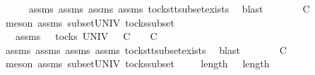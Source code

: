 \ \ \ \ \isamarkupfalse%
\ assms{\isacharparenleft}{}{\isacharparenright}\ assms{\isacharparenleft}{}{\isacharparenright}\ assms{\isacharparenleft}{}{\isacharparenright}\ assms{\isacharparenleft}{}{\isacharparenright}\ tocks{\isacharunderscore}tt{\isacharunderscore}subset{\isacharunderscore}exists\ \isamarkupfalse%
\ blast\isanewline
\ \ \isamarkupfalse%
\ \isamarkupfalse%
\ {}{\isacharcolon}\ {\isachardoublequoteopen}{\isasymrho}{\isacharprime}{\isacharprime}\ {\isasymle}\isactrlsub C\ {\isasymrho}{\isacharprime}{\isachardoublequoteclose}\isanewline
\ \ \ \ \isamarkupfalse%
\ {\isacharparenleft}meson\ assms{\isacharparenleft}{}{\isacharparenright}\ subset{\isacharunderscore}UNIV\ tocks{\isacharunderscore}subset{\isacharparenright}\isanewline
\ \ \isamarkupfalse%
\ {\isasymrho}{\isacharprime}{\isacharprime}{\isacharprime}\ \ {\isasymrho}{\isacharprime}{\isacharprime}{\isacharprime}{\isacharunderscore}assms{\isacharcolon}\ {\isachardoublequoteopen}{\isasymrho}{\isacharprime}{\isacharprime}{\isacharprime}\ {\isasymin}\ tocks\ UNIV\ {\isasymand}\ {\isasymrho}{\isacharprime}\ {\isasymsubseteq}\isactrlsub C\ {\isasymrho}{\isacharprime}{\isacharprime}{\isacharprime}\ {\isasymand}\ {\isasymrho}{\isacharprime}{\isacharprime}{\isacharprime}\ {\isasymle}\isactrlsub C\ {\isasymrho}\ {\isacharat}\ {\isasymsigma}{\isachardoublequoteclose}\isanewline
\ \ \ \ \isamarkupfalse%
\ assms{\isacharparenleft}{}{\isacharparenright}\ assms{\isacharparenleft}{}{\isacharparenright}\ assms{\isacharparenleft}{}{\isacharparenright}\ assms{\isacharparenleft}{}{\isacharparenright}\ tocks{\isacharunderscore}tt{\isacharunderscore}subset{\isacharunderscore}exists{}\ \isamarkupfalse%
\ blast\isanewline
\ \ \isamarkupfalse%
\ \isamarkupfalse%
\ {}{\isacharcolon}\ {\isachardoublequoteopen}{\isasymrho}{\isacharprime}{\isacharprime}{\isacharprime}\ {\isasymle}\isactrlsub C\ {\isasymrho}{\isachardoublequoteclose}\isanewline
\ \ \ \ \isamarkupfalse%
\ {\isacharparenleft}meson\ assms{\isacharparenleft}{}{\isacharparenright}\ subset{\isacharunderscore}UNIV\ tocks{\isacharunderscore}subset{\isacharparenright}\isanewline
\ \ \isamarkupfalse%
\ {}{\isacharcolon}\ {\isachardoublequoteopen}length\ {\isasymrho}{\isacharprime}\ {\isacharequal}\ length\ {\isasymrho}{\isacharprime}{\isacharprime}{\isacharprime}{\isachardoublequoteclose}\isanewline
